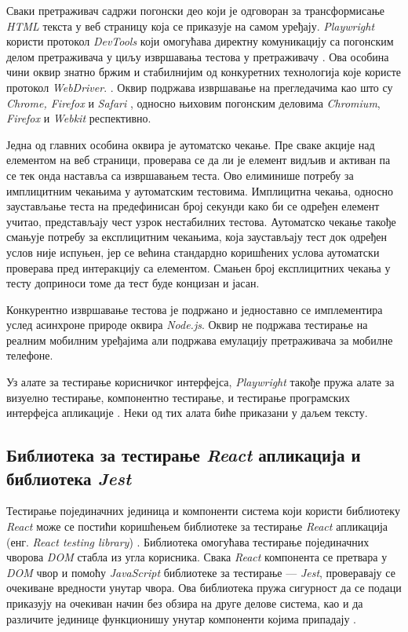 \documentclass[12pt,oneside]{memoir}
\begin{document}
Сваки претраживач садржи погонски део који је одговоран за трансформисање \textit{HTML} текста у веб страницу која се приказује на самом уређају. \textit{Playwright} користи протокол \textit{DevTools} који омогућава директну комуникацију са погонским делом претраживача у циљу извршавања тестова у претраживачу \cite{playwrightTutorial}. Ова особина чини оквир знатно бржим и стабилнијим од конкуретних технологија које користе протокол \textit{WebDriver}. \cite{playwrightVsSelenium,speedTest}. Оквир подржава извршавање на прегледачима као што су \textit{Chrome,  Firefox} и \textit{Safari} , односно њиховим погонским деловима \textit{Chromium}, \textit{Firefox} и \textit{Webkit} респективно\cite{playwright, chromium,webKit}.

Једна од главних особина оквира је аутоматско чекање. Пре сваке акције над елементом на веб страници, проверава се да ли је елемент видљив и активан па се тек онда наставља са извршавањем теста. Ово елиминише потребу за имплицитним чекањима у аутоматским тестовима. Имплицитна чекања, односно заустављање теста на предефинисан број секунди како би се одређен елемент учитао, представљају чест узрок нестабилних тестова. Аутоматско чекање такође смањује потребу за експлицитним чекањима, која заустављају тест док одређен услов није испуњен, јер се већина стандардно коришћених услова аутоматски проверава пред интеракцију са елементом. Смањен број експлицитних чекања у тесту доприноси томе да тест буде концизан и јасан.

Конкурентно извршавање тестова је подржано и једноставно се имплементира услед асинхроне природе оквира \textit{Node.js}. Оквир не подржава тестирање на реалним мобилним уређајима али подржава емулацију претраживача за мобилне телефоне.

Уз алате за тестирање корисничког интерфејса, \textit{Playwright} такође пружа алате за визуелно тестирање, компонентно тестирање, и тестирање програмских интерфејса апликације \cite{playwright}. Неки од тих алата биће приказани у даљем тексту.

\subsection{Библиотека за тестирање \textit{React} апликација и  библиотека \textit{Jest}}

Тестирање појединачних јединица и компоненти система који користи библиотеку \textit{React} може се постићи коришћењем библиотеке за тестирање \textit{React} апликација (енг.\textit{ React testing library}) \cite{rtl}. Библиотека омогућава тестирање појединачних чворова \textit{DOM} стабла из угла корисника. Свака \textit{React} компонента се претвара у \textit{DOM} чвор и помоћу \textit{JavaScript} библиотеке за тестирање --- \textit{Jest}, проверавају се очекиване вредности унутар чвора. Ова библиотека пружа сигурност да се подаци приказују на очекиван начин без обзира на друге делове система, као и да различите јединице функционишу унутар компоненти којима припадају \cite{rtl,jest}.
\end{document}

